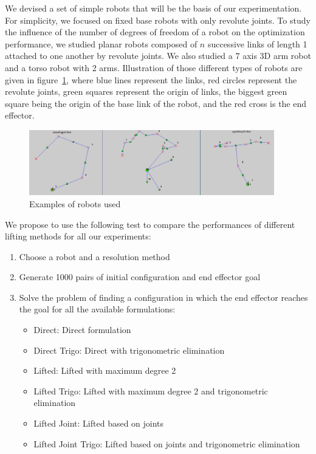 We devised a set of simple robots that will be the basis of our experimentation.
For simplicity, we focused on fixed base robots with only revolute joints.
To study the influence of the number of degrees of freedom of a robot on the optimization performance, we studied planar robots composed of $n$ successive links of length 1 attached to one another by revolute joints.
We also studied a 7 axis 3D arm robot and a torso robot with 2 arms.
Illustration of those different types of robots are given in figure~\ref{fig:robots}, where blue lines represent the links, red circles represent the revolute joints, green squares represent the origin of links, the biggest green square being the origin of the base link of the robot, and the red cross is the end effector.
\begin{figure}[ht]
  \centering
  \includegraphics[width=0.95\textwidth]{robots.png}
  \caption{Examples of robots used}
\label{fig:robots}
\end{figure}

We propose to use the following test to compare the performances of different lifting methods for all our experiments:
\begin{enumerate}
  \item Choose a robot and a resolution method
  \item Generate 1000 pairs of initial configuration and end effector goal
  \item Solve the problem of finding a configuration in which the end effector reaches the goal for all the available formulations:
  \begin{itemize}
    \item Direct: Direct formulation
    \item Direct Trigo: Direct with trigonometric elimination
    \item Lifted: Lifted with maximum degree 2
    \item Lifted Trigo: Lifted with maximum degree 2 and trigonometric elimination
    \item Lifted Joint: Lifted based on joints
    \item Lifted Joint Trigo: Lifted based on joints and trigonometric elimination
  \end{itemize}
\end{enumerate}

